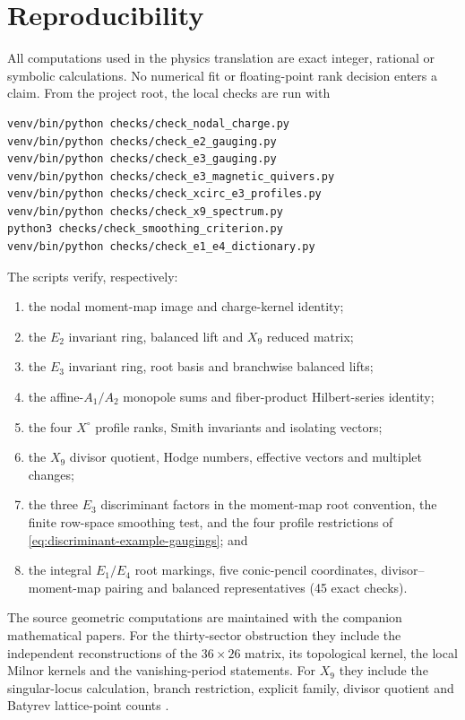 \section{Reproducibility}
\label{app:reproducibility}

All computations used in the physics translation are exact integer, rational
or symbolic calculations. No numerical fit or floating-point rank decision
enters a claim. From the project root, the local checks are run with
\begin{verbatim}
venv/bin/python checks/check_nodal_charge.py
venv/bin/python checks/check_e2_gauging.py
venv/bin/python checks/check_e3_gauging.py
venv/bin/python checks/check_e3_magnetic_quivers.py
venv/bin/python checks/check_xcirc_e3_profiles.py
venv/bin/python checks/check_x9_spectrum.py
python3 checks/check_smoothing_criterion.py
venv/bin/python checks/check_e1_e4_dictionary.py
\end{verbatim}
The scripts verify, respectively:
\begin{enumerate}
 \item the nodal moment-map image and charge-kernel identity;
 \item the $E_2$ invariant ring, balanced lift and $X_9$ reduced matrix;
 \item the $E_3$ invariant ring, root basis and branchwise balanced lifts;
 \item the affine-$A_1/A_2$ monopole sums and fiber-product Hilbert-series
 identity;
 \item the four $X^{\circ}$ profile ranks, Smith invariants and isolating
 vectors;
 \item the $X_9$ divisor quotient, Hodge numbers, effective vectors and
 multiplet changes;
 \item the three $E_3$ discriminant factors in the moment-map root
 convention, the finite row-space smoothing test, and the four
 profile restrictions of \eqref{eq:discriminant-example-gaugings}; and
 \item the integral $E_1/E_4$ root markings, five conic-pencil coordinates,
 divisor--moment-map pairing and balanced representatives (45 exact checks).
\end{enumerate}

The source geometric computations are maintained with the companion
mathematical papers. For the thirty-sector obstruction they include the
independent reconstructions of the $36\times26$ matrix, its topological kernel,
the local Milnor kernels and the vanishing-period statements. For $X_9$ they
include the singular-locus calculation, branch restriction, explicit family,
divisor quotient and Batyrev lattice-point counts
\cite{Wuebben:2026obstruction,Wuebben:2026smoothing}.

